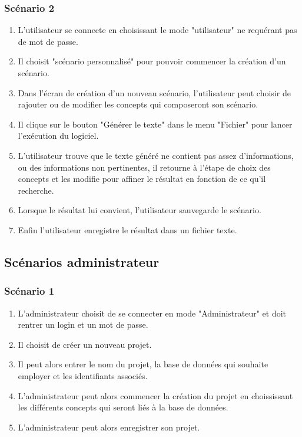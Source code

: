 \documentclass[12pt]{report}
\begin{document}
\subsubsection{Scénario 2}
    \begin{enumerate}
    		\item L'utilisateur se connecte en choisissant le mode "utilisateur" ne requérant pas de mot de passe.
           \item Il choisit "scénario personnalisé" pour pouvoir commencer la création d'un scénario.
           	\item Dans l'écran  de création d'un nouveau scénario, l'utilisateur peut choisir de rajouter ou de modifier les concepts qui composeront son scénario.
            \item Il clique sur le bouton "Générer le texte" dans le menu "Fichier" pour lancer l'exécution du logiciel.
            \item L'utilisateur trouve que le texte généré ne contient pas assez d'informations, ou des informations non pertinentes, il retourne à l'étape de choix des concepts et les modifie pour affiner le résultat en fonction de ce qu'il recherche.
            \item Lorsque le résultat lui convient, l'utilisateur sauvegarde le scénario.
            \item Enfin l'utilisateur enregistre le résultat dans un fichier texte.
            \end{enumerate}


\subsection{Scénarios administrateur}

\subsubsection{Scénario 1}
    \begin{enumerate}
    \item L'administrateur choisit de se connecter en mode "Administrateur" et doit rentrer un login et un mot de passe.
            \item Il choisit de créer un nouveau projet.
            \item Il peut alors entrer le nom du projet, la base de données qui souhaite employer et les identifiants associés.
            \item L'administrateur peut alors commencer la création du projet en choississant les différents concepts qui seront liés à la base de données.
            \item L'administrateur peut alors enregistrer son projet.
            \end{enumerate}
\end{document}
